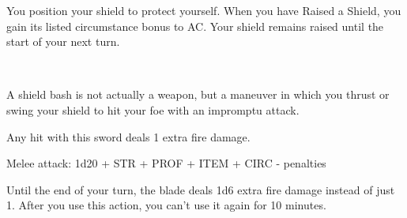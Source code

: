 \documentclass[paper=63mm:88mm, DIV=21, fontsize=7.5pt]{scrartcl}
\begin{document}

You position your shield to protect yourself. When you have Raised a Shield, you gain its listed circumstance bonus to AC. Your shield remains raised until the start of your next turn.


\\

A shield bash is not actually a weapon, but a maneuver in which you thrust or swing your shield to hit your foe with an impromptu attack.




Any hit with this sword deals 1 extra fire damage.

Melee attack: 1d20 + STR + PROF + ITEM + CIRC - penalties



Until the end of your turn, the blade deals 1d6 extra fire damage instead of just 1. After you use this action, you can't use it again for 10 minutes.

\vfill

\\
\end{document}
